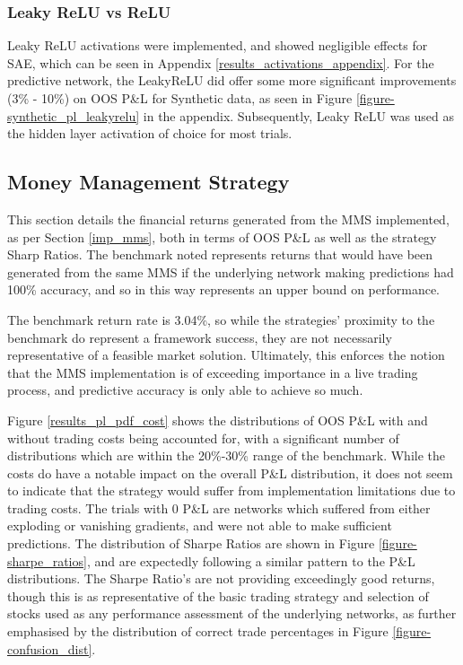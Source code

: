 \documentclass[a4paper,11pt,oneside]{article}
\theoremstyle{plain}
\theoremstyle{definition}
\begin{document}
	\subsubsection{Leaky ReLU vs ReLU}
	
	Leaky ReLU activations were implemented, and showed negligible effects for SAE, which can be seen in Appendix \ref{results_activations_appendix}. For the predictive network, the LeakyReLU did offer some more significant improvements (3\% - 10\%) on OOS P\&L for Synthetic data, as seen in Figure \ref{figure-synthetic_pl_leakyrelu} in the appendix. Subsequently, Leaky ReLU was used as the hidden layer activation of choice for most trials.
	
	\newpage
	\subsection{Money Management Strategy}\label{results_mms}
	
	This section details the financial returns generated from the MMS implemented, as per Section \ref{imp_mms}, both in terms of OOS P\&L as well as the strategy Sharp Ratios. The benchmark noted represents returns that would have been generated from the same MMS if the underlying network making predictions had 100\% accuracy, and so in this way represents an upper bound on performance.\newline
	
	The benchmark return rate is 3.04\%, so while the strategies' proximity to the benchmark do represent a framework success, they are not necessarily representative of a feasible market solution. Ultimately, this enforces the notion that the MMS implementation is of exceeding importance in a live trading process, and predictive accuracy is only able to achieve so much. \newline
	
	Figure \ref{results_pl_pdf_cost} shows the distributions of OOS P\&L with and without trading costs being accounted for, with a significant number of distributions which are within the 20\%-30\% range of the benchmark. While the costs do have a notable impact on the overall P\&L distribution, it does not seem to indicate that the strategy would suffer from implementation limitations due to trading costs. The trials with 0 P\&L are networks which suffered from either exploding or vanishing gradients, and were not able to make sufficient predictions. The distribution of Sharpe Ratios are shown in Figure \ref{figure-sharpe_ratios}, and are expectedly following a similar pattern to the P\&L distributions. The Sharpe Ratio's are not providing exceedingly good returns, though this is as representative of the basic trading strategy and selection of stocks used as any performance assessment of the underlying networks, as further emphasised by the distribution of correct trade percentages in Figure \ref{figure-confusion_dist}. \newline 
	
\end{document}
